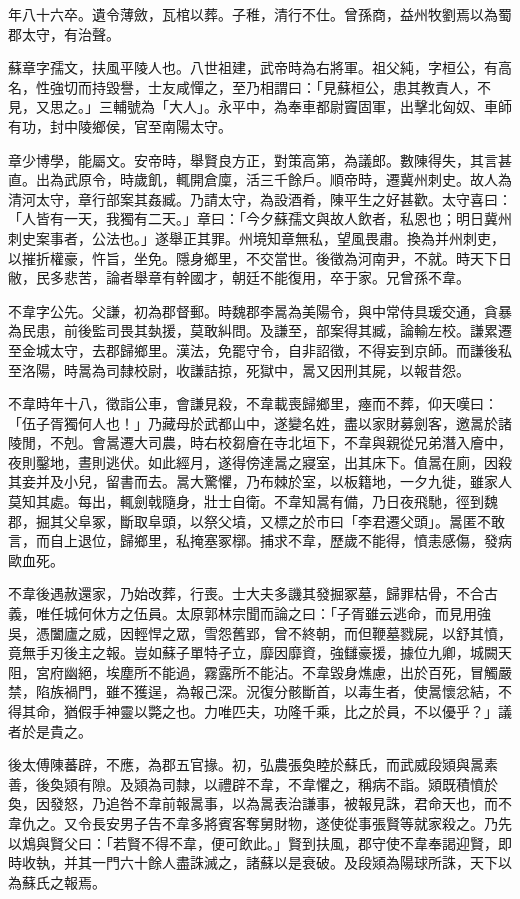 \begin{pinyinscope}
年八十六卒。遺令薄斂，瓦棺以葬。子稚，清行不仕。曾孫商，益州牧劉焉以為蜀郡太守，有治聲。

蘇章字孺文，扶風平陵人也。八世祖建，武帝時為右將軍。祖父純，字桓公，有高名，性強切而持毀譽，士友咸憚之，至乃相謂曰：「見蘇桓公，患其教責人，不見，又思之。」三輔號為「大人」。永平中，為奉車都尉竇固軍，出擊北匈奴、車師有功，封中陵鄉侯，官至南陽太守。

章少博學，能屬文。安帝時，舉賢良方正，對策高第，為議郎。數陳得失，其言甚直。出為武原令，時歲飢，輒開倉廩，活三千餘戶。順帝時，遷冀州刺史。故人為清河太守，章行部案其姦臧。乃請太守，為設酒肴，陳平生之好甚歡。太守喜曰：「人皆有一天，我獨有二天。」章曰：「今夕蘇孺文與故人飲者，私恩也；明日冀州刺史案事者，公法也。」遂舉正其罪。州境知章無私，望風畏肅。換為并州刺吏，以摧折權豪，忤旨，坐免。隱身鄉里，不交當世。後徵為河南尹，不就。時天下日敝，民多悲苦，論者舉章有幹國才，朝廷不能復用，卒于家。兄曾孫不韋。

不韋字公先。父謙，初為郡督郵。時魏郡李暠為美陽令，與中常侍具瑗交通，貪暴為民患，前後監司畏其埶援，莫敢糾問。及謙至，部案得其臧，論輸左校。謙累遷至金城太守，去郡歸鄉里。漢法，免罷守令，自非詔徵，不得妄到京師。而謙後私至洛陽，時暠為司隸校尉，收謙詰掠，死獄中，暠又因刑其屍，以報昔怨。

不韋時年十八，徵詣公車，會謙見殺，不韋載喪歸鄉里，瘞而不葬，仰天嘆曰：「伍子胥獨何人也！」乃藏母於武都山中，遂變名姓，盡以家財募劍客，邀暠於諸陵閒，不剋。會暠遷大司農，時右校芻廥在寺北垣下，不韋與親從兄弟潛入廥中，夜則鑿地，晝則逃伏。如此經月，遂得傍達暠之寢室，出其床下。值暠在廁，因殺其妾并及小兒，留書而去。暠大驚懼，乃布棘於室，以板籍地，一夕九徙，雖家人莫知其處。每出，輒劍戟隨身，壯士自衛。不韋知暠有備，乃日夜飛馳，徑到魏郡，掘其父阜冢，斷取阜頭，以祭父墳，又標之於市曰「李君遷父頭」。暠匿不敢言，而自上退位，歸鄉里，私掩塞冢槨。捕求不韋，歷歲不能得，憤恚感傷，發病歐血死。

不韋後遇赦還家，乃始改葬，行喪。士大夫多譏其發掘冢墓，歸罪枯骨，不合古義，唯任城何休方之伍員。太原郭林宗聞而論之曰：「子胥雖云逃命，而見用強吳，憑闔廬之威，因輕悍之眾，雪怨舊郢，曾不終朝，而但鞭墓戮屍，以舒其憤，竟無手刃後主之報。豈如蘇子單特孑立，靡因靡資，強讎豪援，據位九卿，城闕天阻，宮府幽絕，埃塵所不能過，霧露所不能沾。不韋毀身燋慮，出於百死，冒觸嚴禁，陷族禍門，雖不獲逞，為報己深。況復分骸斷首，以毒生者，使暠懷忿結，不得其命，猶假手神靈以斃之也。力唯匹夫，功隆千乘，比之於員，不以優乎？」議者於是貴之。

後太傅陳蕃辟，不應，為郡五官掾。初，弘農張奐睦於蘇氏，而武威段熲與暠素善，後奐熲有隙。及熲為司隸，以禮辟不韋，不韋懼之，稱病不詣。熲既積憤於奐，因發怒，乃追咎不韋前報暠事，以為暠表治謙事，被報見誅，君命天也，而不韋仇之。又令長安男子告不韋多將賓客奪舅財物，遂使從事張賢等就家殺之。乃先以鴆與賢父曰：「若賢不得不韋，便可飲此。」賢到扶風，郡守使不韋奉謁迎賢，即時收執，并其一門六十餘人盡誅滅之，諸蘇以是衰破。及段熲為陽球所誅，天下以為蘇氏之報焉。


\end{pinyinscope}
